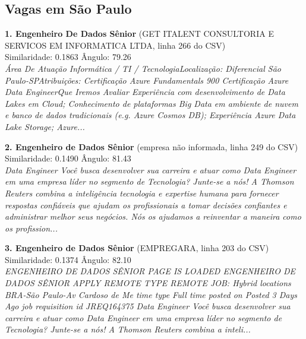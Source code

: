 \documentclass{article}%
\begin{document}
\subsection{Vagas em São Paulo}%
\label{subsec:VagasemSoPaulo}%
\textbf{1. Engenheiro De Dados Sênior} (GET ITALENT CONSULTORIA E SERVICOS EM INFORMATICA LTDA, linha 266 do CSV)\\%
Similaridade: 0.1863 \quad Ângulo: 79.26\textdegree\\%
\textit{Área De Atuação Informática / TI / TecnologiaLocalização: Diferencial São Paulo-SPAtribuições: Certificação Azure Fundamentals 900 Certificação Azure Data EngineerQue Iremos Avaliar Experiência com desenvolvimento de Data Lakes em Cloud; Conhecimento de plataformas Big Data em ambiente de nuvem e banco de dados tradicionais (e.g. Azure Cosmos DB); Experiência Azure Data Lake Storage; Azure...}\par\medskip%
\textbf{2. Engenheiro de Dados Sênior} (empresa não informada, linha 249 do CSV)\\%
Similaridade: 0.1490 \quad Ângulo: 81.43\textdegree\\%
\textit{Data Engineer Você busca desenvolver sua carreira e atuar como Data Engineer em uma empresa líder no segmento de Tecnologia? Junte-se a nós! A Thomson Reuters combina a inteligência tecnologia e expertise humana para fornecer respostas confiáveis que ajudam os profissionais a tomar decisões confiantes e administrar melhor seus negócios. Nós os ajudamos a reinventar a maneira como os profission...}\par\medskip%
\textbf{3. Engenheiro de Dados Sênior} (EMPREGARA, linha 203 do CSV)\\%
Similaridade: 0.1374 \quad Ângulo: 82.10\textdegree\\%
\textit{ENGENHEIRO DE DADOS SÊNIOR PAGE IS LOADED ENGENHEIRO DE DADOS SÊNIOR APPLY REMOTE TYPE REMOTE JOB: Hybrid locations BRA-São Paulo-Av Cardoso de Me time type Full time posted on Posted 3 Days Ago job requisition id JREQ164375 Data Engineer Você busca desenvolver sua carreira e atuar como Data Engineer em uma empresa líder no segmento de Tecnologia? Junte-se a nós! A Thomson Reuters combina a inteli...}\par\medskip

%
\end{document}
